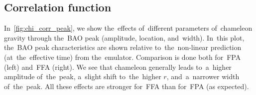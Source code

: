 

\subsection{Correlation function}
In~\autoref{fig:chi_corr_peak}, we show the~effects of~different parameters of~chameleon gravity through the~BAO peak (amplitude, location, and~width). In~this plot, the~BAO peak characteristics are shown relative to~the~non-linear prediction (at~the~effective time) from the~emulator. Comparison is done both for~FPA (left) and~FFA (right). We see that chameleon generally leads to~a~higher amplitude of~the~peak, a~slight shift to~the~higher $r$, and~a~narrower width of~the~peak. All these effects are stronger for~FFA than for~FPA (as expected).

